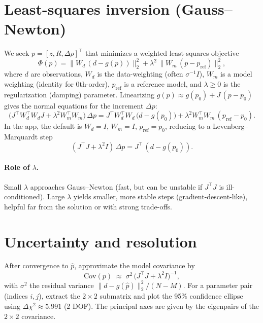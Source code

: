 \documentclass[11pt,a4paper]{article}
\begin{document}
\section*{Least-squares inversion (Gauss--Newton)}
We seek $p=[z, R, \Delta\rho]^\top$ that minimizes a weighted least-squares objective
\begin{equation}
  \Phi(p) = \bigl\| W_d\,(d - g(p)) \bigr\|_2^2 + \lambda^2\,\bigl\| W_m\,(p - p_{\mathrm{ref}}) \bigr\|_2^2,
  \label{eq:objective}
\end{equation}
where $d$ are observations, $W_d$ is the data-weighting (often $\sigma^{-1}I$), $W_m$ is a model weighting (identity for 0th-order), $p_{\mathrm{ref}}$ is a reference model, and $\lambda\ge0$ is the regularization (damping) parameter.
Linearizing $g(p)\approx g(p_0)+J\,(p-p_0)$ gives the normal equations for the increment $\Delta p$:
\begin{equation}
  \bigl(J^\top W_d^\top W_d J + \lambda^2 W_m^\top W_m\bigr)\,\Delta p
  = J^\top W_d^\top W_d\,\bigl(d - g(p_0)\bigr) + \lambda^2 W_m^\top W_m\,(p_{\mathrm{ref}}-p_0).
\end{equation}
In the app, the default is $W_d=I$, $W_m=I$, $p_{\mathrm{ref}}=p_0$, reducing to a Levenberg--Marquardt step
\begin{equation}
  (J^\top J + \lambda^2 I)\,\Delta p = J^\top\,(d - g(p_0)).
\end{equation}
\paragraph{Role of $\lambda$.} Small $\lambda$ approaches Gauss--Newton (fast, but can be unstable if $J^\top J$ is ill-conditioned). Large $\lambda$ yields smaller, more stable steps (gradient-descent-like), helpful far from the solution or with strong trade-offs.

\section*{Uncertainty and resolution}
After convergence to $\hat p$, approximate the model covariance by
\begin{equation}
  \mathrm{Cov}(p) \;\approx\; \sigma^2\,\bigl(J^\top J + \lambda^2 I\bigr)^{-1},
\end{equation}
with $\sigma^2$ the residual variance $\|d-g(\hat p)\|_2^2/(N-M)$. For a parameter pair (indices $i,j$), extract the $2\times2$ submatrix and plot the 95\% confidence ellipse using $\Delta\chi^2\approx5.991$ (2 DOF). The principal axes are given by the eigenpairs of the $2\times2$ covariance.
\end{document}
